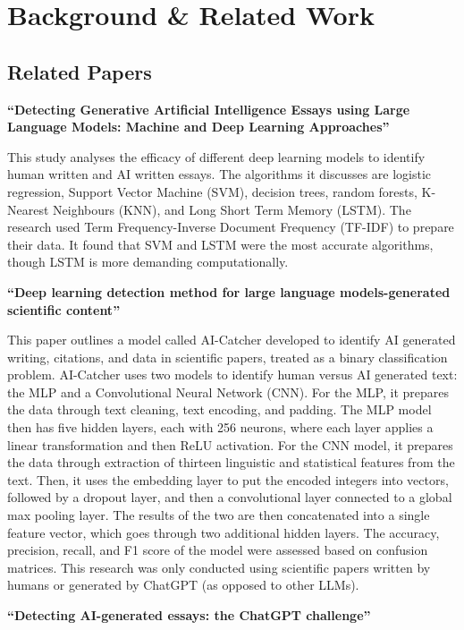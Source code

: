 \documentclass{article} %
\begin{document}
\section{Background \& Related Work}

\subsection{Related Papers}

\textbf{``Detecting Generative Artificial Intelligence Essays using Large Language Models: Machine and Deep Learning Approaches''}  ~\citep{Approaches}

This study analyses the efficacy of different deep learning models to identify human written and AI written essays. The algorithms it discusses are logistic regression, Support Vector Machine (SVM), decision trees, random forests, K-Nearest Neighbours (KNN), and Long Short Term Memory (LSTM). The research used Term Frequency-Inverse Document Frequency (TF-IDF) to prepare their data. It found that SVM and LSTM were the most accurate algorithms, though LSTM is more demanding computationally.

\textbf{``Deep learning detection method for large language models-generated scientific content''} ~\citep{DeepLearning2024}

This paper outlines a model called AI-Catcher developed to identify AI generated writing, citations, and data in scientific papers, treated as a binary classification problem. AI-Catcher uses two models to identify human versus AI generated text: the MLP and a Convolutional Neural Network (CNN). For the MLP, it prepares the data through text cleaning, text encoding, and padding. The MLP model then has five hidden layers, each with 256 neurons, where each layer applies a linear transformation and then ReLU activation. For the CNN model, it prepares the data through extraction of thirteen linguistic and statistical features from the text. Then, it uses the embedding layer to put the encoded integers into vectors, followed by a dropout layer, and then a convolutional layer connected to a global max pooling layer. The results of the two are then concatenated into a single feature vector, which goes through two additional hidden layers. The accuracy, precision, recall, and F1 score of the model were assessed based on confusion matrices. This research was only conducted using scientific papers written by humans or generated by ChatGPT (as opposed to other LLMs).

\textbf{``Detecting AI-generated essays: the ChatGPT challenge''} ~\citep{AIessays2023}
\end{document}
